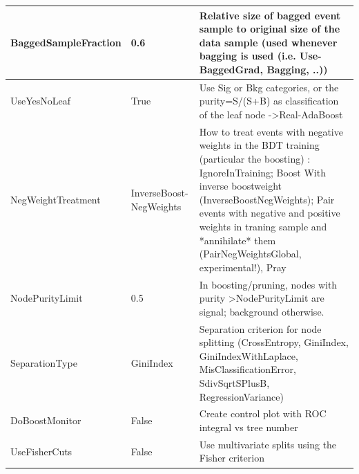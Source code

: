 \documentclass[11pt]{scrartcl}
\begin{document}
\begin{longtable}[c]{|p{4cm}|p{2.5cm}|p{7cm}|}
BaggedSampleFraction & 0.6                    & Relative size of bagged event sample to original size of the data sample (used whenever bagging is used (i.e. Use-BaggedGrad, Bagging, ..))                                                                                                                                                             \\ \hline
UseYesNoLeaf         & True                   & Use Sig or Bkg categories, or the purity=S/(S+B) as classification of the leaf node -\textgreater Real-AdaBoost                                                                                                                                                                                         \\ \hline
NegWeightTreatment   & InverseBoost-NegWeights & How to treat events with negative weights in the BDT training (particular the boosting) : IgnoreInTraining; Boost With inverse boostweight (InverseBoostNegWeights); Pair events with negative and positive weights in traning sample and *annihilate* them (PairNegWeightsGlobal, experimental!), Pray \\ \hline
NodePurityLimit      & 0.5                    & In boosting/pruning, nodes with purity \textgreater NodePurityLimit are signal; background otherwise.                                                                                                                                                                                                   \\ \hline
SeparationType       & GiniIndex              & Separation criterion for node splitting (CrossEntropy, GiniIndex, GiniIndexWithLaplace, MisClassificationError, SdivSqrtSPlusB, RegressionVariance)                                                                                                                                                     \\ \hline
DoBoostMonitor       & False                  & Create control plot with ROC integral vs tree number                                                                                                                                                                                                                                                    \\ \hline
UseFisherCuts        & False                  & Use multivariate splits using the Fisher criterion                                                                                                                                                                                                                                                      \\ \hline

\end{longtable}
\end{document}

